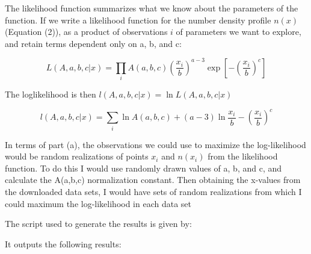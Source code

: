 

The likelihood function summarizes what we know about the parameters of the function. If we write a likelihood function for the number density profile $n(x)$ (Equation (2)), as a product of observations $i$ of parameters we want to explore, and retain terms dependent only on a, b, and c:

\begin{equation}
  L(A,a,b,c \vert x) = \prod_{i} A(a,b,c)\left(\frac{x_i}{b}\right)^{a-3}\exp\left[-\left(\frac{x_i}{b}\right)^c\right]
\end{equation}

The loglikelihood is then $l(A,a,b,c \vert x) = \ln{L(A,a,b,c \vert x)}$

\begin{equation}
  l(A,a,b,c \vert x) = \sum_{i} \ln{A(a,b,c)} + (a-3)\ln{\dfrac{x_i}{b}}-\left(\frac{x_i}{b}\right)^c
\end{equation}



In terms of part (a), the observations we could use to maximize the log-likelihood would be random realizations of points $x_i$ and $n(x_i)$ from the likelihood function. To do this I would use randomly drawn values of a, b, and c, and calculate the A(a,b,c) normalization constant. Then obtaining the x-values from the downloaded data sets, I would have sets of random realizations from which I could maximum the log-likelihood in each data set


The script used to generate the results is given by:


It outputs the following results:

